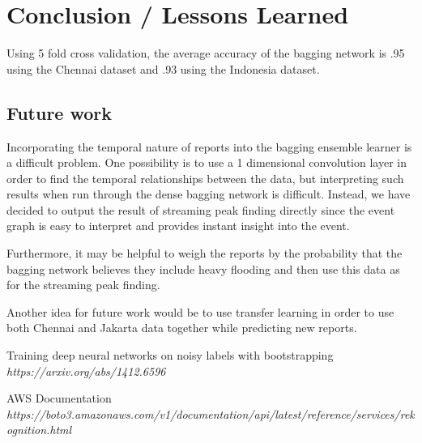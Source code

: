 \section{Conclusion / Lessons Learned}
Using 5 fold cross validation, the average accuracy of the bagging network 
is .95 using the Chennai dataset and .93 using the Indonesia dataset.

\subsection{Future work}
Incorporating the temporal nature of reports into the bagging ensemble 
learner is a difficult problem. One possibility is to use a 1 dimensional 
convolution layer in order to find the temporal relationships between the data,
but interpreting such results when run through the dense bagging network is 
difficult. Instead, we have decided to output the result of streaming peak finding 
directly since the event graph is easy to interpret and provides instant 
insight into the event.

Furthermore, it may be helpful to weigh the reports by the probability that 
the bagging network believes they include heavy flooding and then use this data
as for the streaming peak finding.

Another idea for future work would be to use transfer learning in order 
to use both Chennai and Jakarta data together while predicting new reports.

\begin{thebibliography}{}
     Training deep neural networks on noisy labels with bootstrapping
     \emph{https://arxiv.org/abs/1412.6596}
     
     AWS Documentation \\
     \emph{https://boto3.amazonaws.com/v1/documentation/api/latest/reference/services/rekognition.html}

\end{thebibliography}
